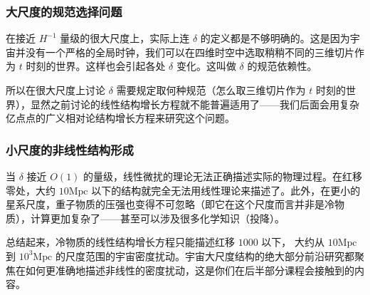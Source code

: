 \documentclass[CJK,13pt]{beamer}
\begin{document}
  \begin{frame}
    \frametitle{大尺度的规范选择问题}
    在接近 $H^{-1}$ 量级的很大尺度上，实际上连 $\delta$ 的定义都是不够明确的。这是因为宇宙并没有一个严格的全局时钟，我们可以在四维时空中选取稍稍不同的三维切片作为 $t$ 时刻的世界。这样也会引起各处 $\delta$ 变化。这叫做 $\delta$ 的规范依赖性。


    所以在很大尺度上讨论 $\delta$ 需要规定取何种规范（怎么取三维切片作为 $t$ 时刻的世界），显然之前讨论的线性结构增长方程就不能普遍适用了——我们后面会用复杂亿点点的广义相对论结构增长方程来研究这个问题。
  \end{frame}


  \begin{frame}
    \frametitle{小尺度的非线性结构形成}
    当 $\delta$ 接近 $O(1)$ 的量级，线性微扰的理论无法正确描述实际的物理过程。在红移零处，大约 $10\mathrm{Mpc}$ 以下的结构就完全无法用线性理论来描述了。此外，在更小的星系尺度，重子物质的压强也变得不可忽略（即它在这个尺度而言并非是冷物质），计算更加复杂了——甚至可以涉及很多化学知识（投降）。

    
    总结起来，冷物质的线性结构增长方程只能描述红移 $1000$ 以下， 大约从 $10\mathrm{Mpc}$ 到 $10^3\mathrm{Mpc}$ 的尺度范围的宇宙密度扰动。宇宙大尺度结构的绝大部分前沿研究都聚焦在如何更准确地描述非线性的密度扰动，这是你们在后半部分课程会接触到的内容。

  \end{frame}
  
    \ech
\end{document}
